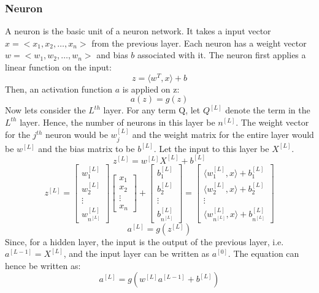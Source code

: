 \documentclass[12pt]{article}
\newcommand{\innerproduct}[2]{\langle#1, #2 \rangle}
\begin{document}
\subsubsection*{Neuron}
A neuron is the basic unit of a neuron network. It takes a input vector $x = <x_1,x_2,\dots,x_n>$ from the previous layer. Each neuron has a weight vector $w = <w_1,w_2,\dots,w_n>$ and bias $b$ associated with it. The neuron first applies a linear function on the input:
\begin{equation*}
    z = \innerproduct{w^T}{x} + b
\end{equation*}
Then, an activation function $a$ is applied on z:
\begin{equation}
    a(z) = g(z)
\end{equation}
\newpage
Now lets consider the $L^{th}$ layer. For any term Q, let $Q^{[L]}$ denote the term in the $L^{th}$ layer. Hence, the number of neurons in this layer be $n^{[L]}$. The weight vector for the $j^{th}$ neuron would be $w^{[L]}_j$ and the weight matrix for the entire layer would be $w^{[L]}$ and the bias matrix to be $b^{[L]}$. Let the input to this layer be $X^{[L]}$.
\begin{equation}
    z^{[L]} = w^{[L]}X^{[L]} + b^{[L]}
\end{equation}
\begin{equation}
    z^{[L]} = \begin{bmatrix} w^{[L]}_1 \\ w^{[L]}_2 \\ \vdots \\ w^{[L]}_{n^{[L]}} \end{bmatrix} \begin{bmatrix} x_1 \\ x_2 \\ \vdots \\ x_n \end{bmatrix} + \begin{bmatrix} b^{[L]}_1 \\ b^{[L]}_2 \\ \vdots \\ b^{[L]}_{n^{[L]}} \end{bmatrix} = \begin{bmatrix} \innerproduct{w^{[L]}_1}{x} + b^{[L]}_1 \\ \innerproduct{w^{[L]}_2}{x} + b^{[L]}_2 \\ \vdots \\ \innerproduct{w^{[L]}_{n^{[L]}}}{x} + b^{[L]}_{n^{[L]}} \end{bmatrix}
\end{equation}
\begin{equation}
    a^{[L]} = g(z^{[L]})
\end{equation}
Since, for a hidden layer, the input is the output of the previous layer, i.e. $a^{[L-1]}=X^{[L]}$, and the input layer can be written as $a^{[0]}$. The equation can hence be written as:
\begin{equation}
    a^{[L]} = g(w^{[L]}a^{[L-1]} + b^{[L]})
\end{equation}
\end{document}
